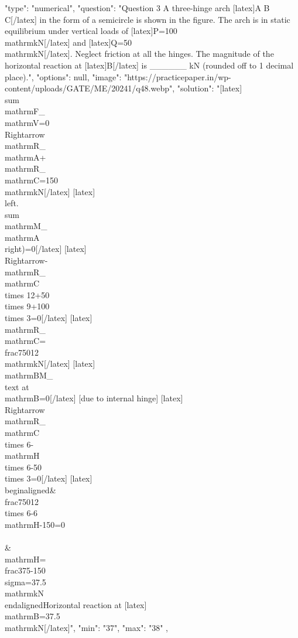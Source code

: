   {
    "type": "numerical",
    "question": "Question 3 A three-hinge arch [latex]A B C[/latex] in the form of a semicircle is shown in the figure. The arch is in static equilibrium under vertical loads of [latex]P=100 \\mathrm{kN}[/latex] and [latex]Q=50 \\mathrm{kN}[/latex]. Neglect friction at all the hinges. The magnitude of the horizontal reaction at [latex]B[/latex] is ______ kN (rounded off to 1 decimal place).",
    "options": null,
    "image": "https://practicepaper.in/wp-content/uploads/GATE/ME/20241/q48.webp",
    "solution": "[latex]\\sum \\mathrm{F}_{\\mathrm{V}}=0 \\Rightarrow \\mathrm{R}_{\\mathrm{A}}+\\mathrm{R}_{\\mathrm{C}}=150 \\mathrm{kN}[/latex] [latex]\\left.\\sum \\mathrm{M}_{\\mathrm{A}}\\right)=0[/latex] [latex]\\Rightarrow-\\mathrm{R}_{\\mathrm{C}} \\times 12+50 \\times 9+100 \\times 3=0[/latex] [latex]\\mathrm{R}_{\\mathrm{C}}=\\frac{750}{12} \\mathrm{kN}[/latex] [latex]\\mathrm{BM}_{\\text {at } \\mathrm{B}=0}[/latex] [due to internal hinge] [latex]\\Rightarrow \\mathrm{R}_{\\mathrm{C}} \\times 6-\\mathrm{H} \\times 6-50 \\times 3=0[/latex] [latex]\n\\begin{aligned}\n& \\frac{750}{12} \\times 6-6 \\mathrm{H}-150=0 \\\\\n& \\mathrm{H}=\\frac{375-150}{\\sigma}=37.5 \\mathrm{kN}\n\\end{aligned}\n[/latex] Horizontal reaction at [latex]\\mathrm{B}=37.5 \\mathrm{kN}[/latex]",
    "min": "37",
    "max": "38"
  },
